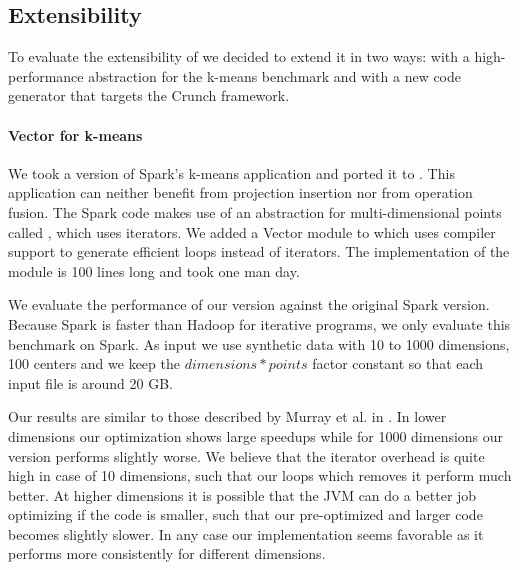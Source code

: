 


\subsection{Extensibility}
\label{subsec:kmeans}

To evaluate the extensibility of \tool we decided to extend it in two ways: 
with a high-performance abstraction for the k-means benchmark and with a new
code generator that targets the Crunch framework.
 
\paragraph{Vector for k-means} 
We took a version of Spark's k-means \cite{spark-nsdi} application and
ported it to \tool. This application can neither benefit from projection
insertion nor from operation fusion. The Spark code makes use of an abstraction
for multi-dimensional points called , which uses iterators. We added
a Vector module to \tool which uses compiler support to generate efficient loops
instead of iterators. The implementation of the  module is 100
lines long and took one man day.

We evaluate the performance of our version against the original Spark version.
Because Spark is faster than Hadoop for iterative programs, we only evaluate
this benchmark on Spark.
As input we use synthetic data with 10 to 1000 dimensions, 100 centers and we keep the
$dimensions * points$ factor constant so that each input file is around 20 GB.

Our results are similar to those described by Murray et al. in
\cite{murray_steno:_2011}. In lower dimensions our optimization shows large
speedups while for 1000 dimensions our version performs slightly worse. We
believe that the iterator overhead is quite high in case of 10 dimensions, such
that our loops which removes it perform much better. At higher dimensions it is
possible that the JVM can do a better job optimizing if the code is smaller,
such that our pre-optimized and larger code becomes slightly slower. In any case
our implementation seems favorable as it performs more consistently for
different dimensions.


